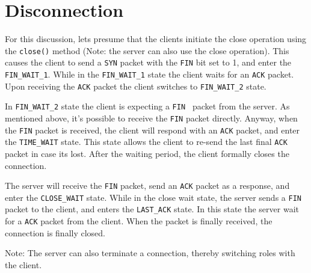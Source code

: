 \documentclass{article}
\begin{document}
\section{Disconnection}

For this discussion, lets presume that the clients initiate the close
operation using the \texttt{close()} method (Note: the server can also use the close
operation). This causes the client to send a \texttt{SYN} packet with the 
\texttt{FIN} bit set to 1, and enter the \texttt{FIN\_WAIT\_1}.
While in the \texttt{FIN\_WAIT\_1} state the client waits for an 
\texttt{ACK} packet. Upon receiving the \texttt{ACK} packet the client
switches to \texttt{FIN\_WAIT\_2} state.

In \texttt{FIN\_WAIT\_2} state the client is expecting a \texttt{FIN%
} packet from the server. As mentioned above, it's possible to receive the 
\texttt{FIN} packet directly. Anyway, when the \texttt{FIN} packet is
received, the client will respond with an \texttt{ACK} packet, and enter the
\texttt{\texttt{TIME\_WAIT}} state. This state allows the client to re-send the last final 
\texttt{ACK} packet in case its lost. After the waiting period, the client
formally closes the connection.

The server will receive the \texttt{FIN} packet, send an \texttt{ACK} packet
as a response, and enter the \texttt{CLOSE\_WAIT} state. While in the close wait
state, the server sends a \texttt{FIN} packet to the client, and enters the 
\texttt{LAST\_ACK} state. In this state the server wait for a \texttt{ACK}
packet from the client. When the packet is finally received, the connection
is finally closed.

Note: The server can also terminate a connection, thereby switching roles
with the client.
\end{document}
